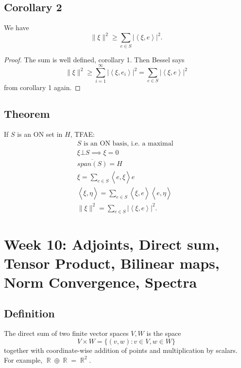 \documentclass{article}
\DeclareMathOperator\R{\mathbb{R}}
\DeclareMathOperator\op{\oplus}
\DeclareMathOperator\la{\langle}
\DeclareMathOperator\ra{\rangle}
\begin{document}
\subsection*{Corollary 2}
We have $$
\|\xi\|^2 \geq \sum_{e \in S} |\la \xi,e \ra|^2.
$$
\begin{proof}
The sum is well defined, corollary 1. Then Bessel says $$
\|\xi\|^2 \geq \sum_{i=1}^{\infty} |\la \xi,e_i \ra|^2 = \sum_{e \in S} |\la \xi,e \ra|^2
$$
from corollary 1 again.
\end{proof}
\subsection*{Theorem}
If $S$ is an ON set in $H$, TFAE:
\begin{gather}
\text{$S$ is an ON basis, i.e. a maximal } \\
\xi \bot S \implies \xi = 0 \\
\overline{span(S)} = H \\
\xi = \sum_{e \in S} \la e,\xi \ra e \\
\la \xi ,\eta \ra = \sum_{e \in S} \la \xi,e \ra \la e, \eta \ra \\
\|\xi\|^2 = \sum_{e \in S} |\la \xi,e \ra|^2.
\end{gather}
\section*{Week 10: Adjoints, Direct sum, Tensor Product, Bilinear maps, Norm Convergence, Spectra }
\subsection*{Definition}
The direct sum of two finite vector spaces $V,W$ is the space $$
V \times W = \{ (v,w): v \in V, w \in W \}
$$
together with coordinate-wise addition of points and multiplication by scalars. For example, $\R \op \R = \R^2$.
\end{document}
